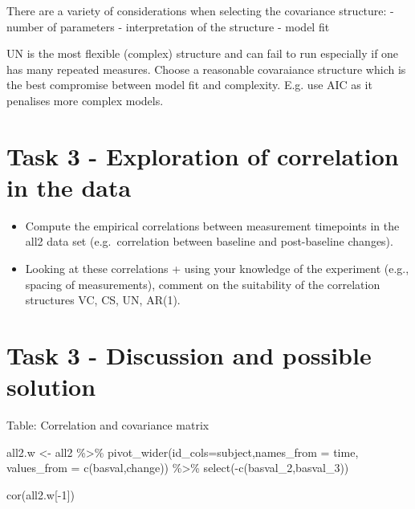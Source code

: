 \documentclass[
  letterpaper,
  DIV=11,
  numbers=noendperiod]{scrreprt}
\newenvironment{Shaded}{\begin{snugshade}}{\end{snugshade}}
\newcommand{\AttributeTok}[1]{\textcolor[rgb]{0.40,0.45,0.13}{#1}}
\newcommand{\DecValTok}[1]{\textcolor[rgb]{0.68,0.00,0.00}{#1}}
\newcommand{\FunctionTok}[1]{\textcolor[rgb]{0.28,0.35,0.67}{#1}}
\newcommand{\NormalTok}[1]{\textcolor[rgb]{0.00,0.23,0.31}{#1}}
\newcommand{\OtherTok}[1]{\textcolor[rgb]{0.00,0.23,0.31}{#1}}
\newcommand{\SpecialCharTok}[1]{\textcolor[rgb]{0.37,0.37,0.37}{#1}}
\providecommand{\tightlist}{%
  \setlength{\itemsep}{0pt}\setlength{\parskip}{0pt}}\usepackage{longtable,booktabs,array}
\begin{document}
There are a variety of considerations when selecting the covariance
structure: - number of parameters - interpretation of the structure -
model fit

UN is the most flexible (complex) structure and can fail to run
especially if one has many repeated measures. Choose a reasonable
covaraiance structure which is the best compromise between model fit and
complexity. E.g. use AIC as it penalises more complex models.

\hypertarget{task-3---exploration-of-correlation-in-the-data}{%
\section{Task 3 - Exploration of correlation in the
data}\label{task-3---exploration-of-correlation-in-the-data}}

\begin{itemize}
\tightlist
\item
  Compute the empirical correlations between measurement timepoints in
  the all2 data set (e.g.~correlation between baseline and post-baseline
  changes).
\item
  Looking at these correlations + using your knowledge of the experiment
  (e.g., spacing of measurements), comment on the suitability of the
  correlation structures VC, CS, UN, AR(1).
\end{itemize}

\hypertarget{task-3---discussion-and-possible-solution}{%
\section{Task 3 - Discussion and possible
solution}\label{task-3---discussion-and-possible-solution}}

Table: Correlation and covariance matrix

\begin{Shaded}
\begin{Highlighting}[]
\NormalTok{all2.w }\OtherTok{\textless{}{-}}\NormalTok{ all2 }\SpecialCharTok{\%\textgreater{}\%} 
  \FunctionTok{pivot\_wider}\NormalTok{(}\AttributeTok{id\_cols=}\NormalTok{subject,}\AttributeTok{names\_from =}\NormalTok{ time, }\AttributeTok{values\_from =} \FunctionTok{c}\NormalTok{(basval,change)) }\SpecialCharTok{\%\textgreater{}\%} 
  \FunctionTok{select}\NormalTok{(}\SpecialCharTok{{-}}\FunctionTok{c}\NormalTok{(basval\_2,basval\_3))}

\FunctionTok{cor}\NormalTok{(all2.w[}\SpecialCharTok{{-}}\DecValTok{1}\NormalTok{]) }
\end{Highlighting}
\end{Shaded}
\end{document}
